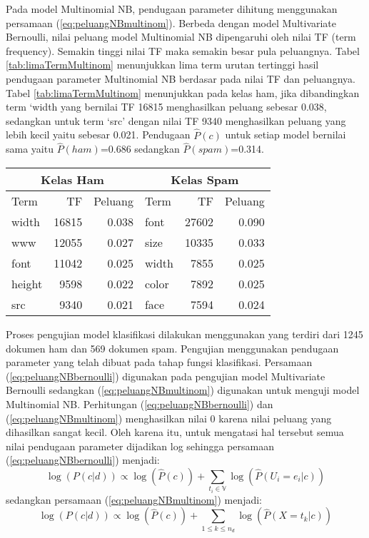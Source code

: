 Pada model Multinomial NB, pendugaan parameter dihitung menggunakan persamaan (\ref{eq:peluangNBmultinom}). Berbeda dengan model Multivariate Bernoulli, nilai peluang model Multinomial NB dipengaruhi oleh nilai TF (term frequency). Semakin tinggi nilai TF maka semakin besar pula peluangnya. Tabel \ref{tab:limaTermMultinom} menunjukkan lima term urutan tertinggi hasil pendugaan parameter Multinomial NB berdasar pada nilai TF dan peluangnya. Tabel \ref{tab:limaTermMultinom} menunjukkan pada kelas ham, jika dibandingkan term ‘width yang bernilai TF 16815 menghasilkan peluang sebesar 0.038, sedangkan untuk term ‘src’ dengan nilai TF 9340 menghasilkan peluang yang lebih kecil yaitu sebesar 0.021. Pendugaan $\hat{P}(c)$ untuk setiap model bernilai sama yaitu $\hat{P}(ham)$=0.686 sedangkan $\hat{P}(spam)$=0.314.
\begin{table*}[h!]
	\begin{center}
		\caption{Lima term hasil pendugaan pada Multinomial NB}
		\label{tab:limaTermMultinom}
		\begin{tabular}{l r r | l r r}
			\hline
			\multicolumn{3}{c|}{Kelas Ham}&\multicolumn{3}{c}{Kelas Spam}\\
			\hline
			Term&TF&Peluang&Term&TF&Peluang\\
			\hline
		width&16815&0.038&font&27602&0.090\\
		www&12055&0.027&size&10335&0.033\\
		font&11042&0.025&width&7855&0.025\\
		height&9598&0.022&color&7892&0.025\\
		src&9340&0.021&face&7594&0.024\\
			\hline
		\end{tabular}
	\end{center}
\end{table*}

Proses pengujian model klasifikasi dilakukan menggunakan
yang terdiri dari 1245 dokumen ham dan 569 dokumen spam. Pengujian menggunakan pendugaan parameter yang telah dibuat pada tahap fungsi klasifikasi. Persamaan (\ref{eq:peluangNBbernoulli}) digunakan pada pengujian model Multivariate Bernoulli sedangkan (\ref{eq:peluangNBmultinom}) digunakan untuk menguji model Multinomial NB. Perhitungan (\ref{eq:peluangNBbernoulli}) dan (\ref{eq:peluangNBmultinom}) menghasilkan nilai 0 karena nilai peluang yang dihasilkan sangat kecil. Oleh karena itu, untuk mengatasi hal tersebut semua nilai pendugaan parameter dijadikan log sehingga persamaan (\ref{eq:peluangNBbernoulli}) menjadi:
\begin{equation*}
\log(P(c|d))\propto \log(\hat{P}(c))+\sum_{t_i\in \mathbb{V}}\log(\hat{P}(U_i=e_i|c))
\end{equation*}
\noindent sedangkan persamaan (\ref{eq:peluangNBmultinom}) menjadi:
\begin{equation*}
\log(P(c|d))\propto \log(\hat{P}(c))+\sum_{1\leq k\leq n_d}\log(\hat{P}(X=t_k|c))
\end{equation*}

